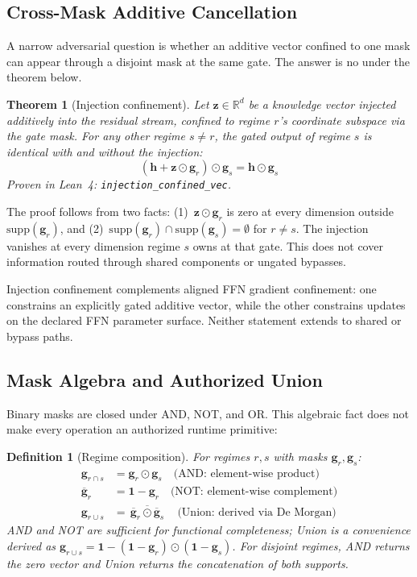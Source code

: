 \documentclass[11pt,a4paper]{article}
\newtheorem{theorem}{Theorem}
\newtheorem{definition}{Definition}
\newcommand{\R}{\mathbb{R}}
\newcommand{\bh}{\mathbf{h}}
\newcommand{\bg}{\mathbf{g}}
\begin{document}
\subsection{Cross-Mask Additive Cancellation}
\label{sec:additive-cancellation}

A narrow adversarial question is whether an additive vector confined
to one mask can appear through a disjoint mask at the same gate.  The
answer is no under the theorem below.

\begin{theorem}[Injection confinement]
\label{thm:injection-confinement}
Let $\mathbf{z} \in \R^d$ be a knowledge vector injected
additively into the residual stream, confined to regime $r$'s
coordinate subspace via the gate mask.  For any other regime
$s \neq r$, the gated output of regime $s$ is identical with
and without the injection:
\[
    (\bh + \mathbf{z} \odot \bg_r) \odot \bg_s = \bh \odot \bg_s
\]
Proven in Lean~4: \texttt{injection\_confined\_vec}.
\end{theorem}

The proof follows from two facts: (1)~$\mathbf{z} \odot \bg_r$
is zero at every dimension outside $\mathrm{supp}(\bg_r)$, and
(2)~$\mathrm{supp}(\bg_r) \cap \mathrm{supp}(\bg_s) = \emptyset$
for $r \neq s$.  The injection vanishes at every dimension regime
$s$ owns at that gate.  This does not cover information routed
through shared components or ungated bypasses.

Injection confinement complements aligned FFN gradient confinement:
one constrains an explicitly gated additive vector, while the other
constrains updates on the declared FFN parameter surface.  Neither
statement extends to shared or bypass paths.

\subsection{Mask Algebra and Authorized Union}
\label{sec:composition}

Binary masks are closed under AND, NOT, and OR.  This algebraic fact
does not make every operation an authorized runtime primitive:

\begin{definition}[Regime composition]
\label{def:composition}
For regimes $r, s$ with masks $\bg_r, \bg_s$:
\begin{align}
    \bg_{r \cap s} &= \bg_r \odot \bg_s
    \quad\text{(AND: element-wise product)}
    \label{eq:and} \\
    \overline{\bg}_r &= \mathbf{1} - \bg_r
    \quad\text{(NOT: element-wise complement)}
    \label{eq:not} \\
    \bg_{r \cup s} &= \overline{\,\overline{\bg}_r \odot \overline{\bg}_s\,}
    \quad\text{(Union: derived via De~Morgan)}
    \label{eq:union}
\end{align}
AND and NOT are sufficient for functional completeness; Union is a
convenience derived as $\bg_{r\cup s}=\mathbf{1}-(\mathbf{1}-\bg_r)\odot(\mathbf{1}-\bg_s)$.
For disjoint regimes, AND returns the zero vector and Union
returns the concatenation of both supports.
\end{definition}
\end{document}
